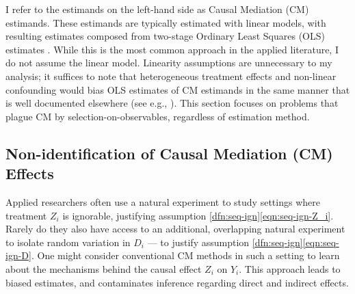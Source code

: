 I refer to the estimands on the left-hand side as Causal Mediation (CM) estimands.
These estimands are typically estimated with linear models, with resulting estimates composed from two-stage Ordinary Least Squares (OLS) estimates \citep{imai2010identification}.
While this is the most common approach in the applied literature, I do not assume the linear model.
Linearity assumptions are unnecessary to my analysis; it suffices to note that heterogeneous treatment effects and non-linear confounding would bias OLS estimates of CM estimands in the same manner that is well documented elsewhere (see e.g., \citealt{angrist1998estimating,sloczynski2022interpreting}).
This section focuses on problems that plague CM by selection-on-observables, regardless of estimation method.

\subsection{Non-identification of Causal Mediation (CM) Effects}
Applied researchers often use a natural experiment to study settings where treatment $Z_i$ is ignorable, justifying assumption \ref{dfn:seq-ign}\eqref{eqn:seq-ign-Z_i}.
Rarely do they also have access to an additional, overlapping natural experiment to isolate random variation in $D_i$ --- to justify assumption \ref{dfn:seq-ign}\eqref{eqn:seq-ign-D}.
One might consider conventional CM methods in such a setting to learn about the mechanisms behind the causal effect $Z_i$ on $Y_i$.
This approach leads to biased estimates, and contaminates inference regarding direct and indirect effects.

